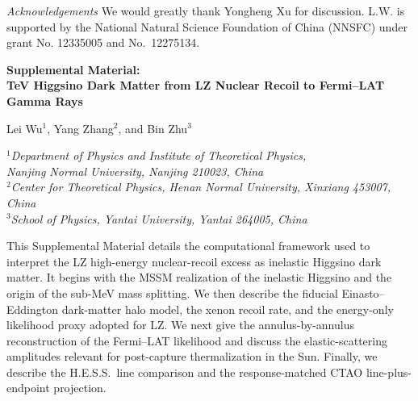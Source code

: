 \documentclass[%
  aps,
  prl,
  reprint,
  superscriptaddress,
  amsmath,
  amssymb,
  longbibliography
]{revtex4-2}
\begin{document}
{\it Acknowledgements} We would greatly thank Yongheng Xu for discussion. L.W. is supported by the National Natural Science Foundation of China (NNSFC) under grant No. 12335005 and No.~12275134.


\clearpage
\onecolumngrid
\hypersetup{
  colorlinks=true,
  citecolor=blue!55!black,
  linkcolor=blue!55!black,
  urlcolor=blue!55!black
}

\begin{center}
{\large\bfseries Supplemental Material:\\
TeV Higgsino Dark Matter from LZ Nuclear Recoil to
Fermi--LAT Gamma Rays\par}
\vspace{1.3em}
Lei Wu$^{1}$, Yang Zhang$^{2}$, and Bin Zhu$^{3}$\\[0.35em]
{\itshape
$^{1}$Department of Physics and Institute of Theoretical Physics,\\
Nanjing Normal University, Nanjing 210023, China\\
$^{2}$Center for Theoretical Physics, Henan Normal University, Xinxiang 453007, China\\
$^{3}$School of Physics, Yantai University, Yantai 264005, China\par}
\end{center}
\vspace{1.5em}

\renewcommand{\theequation}{S.\arabic{equation}}
\renewcommand{\thefigure}{S\arabic{figure}}
\renewcommand{\thetable}{S\arabic{table}}
\setcounter{equation}{0}
\setcounter{figure}{0}
\setcounter{table}{0}
\renewcommand{\theHequation}{supp.\arabic{equation}}
\renewcommand{\theHfigure}{supp.\arabic{figure}}
\renewcommand{\theHtable}{supp.\arabic{table}}





This Supplemental Material details the computational framework used to interpret the LZ high-energy nuclear-recoil excess as inelastic Higgsino dark matter. It begins with the MSSM realization of the inelastic Higgsino and the origin of the sub-MeV mass splitting. We then describe the {fiducial Einasto–Eddington dark-matter halo model}, the xenon recoil rate, and the energy-only likelihood proxy adopted for LZ. We next give the annulus-by-annulus reconstruction of the Fermi--LAT likelihood and discuss the elastic-scattering amplitudes relevant for post-capture thermalization in the Sun. Finally, we describe the H.E.S.S.~line comparison and the response-matched CTAO line-plus-endpoint projection.
\end{document}
